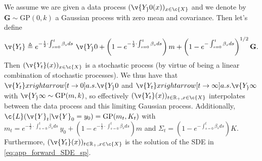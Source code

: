 \begin{proposition}{\parencite{phillips2022spectral}}{} \label{prop:mOU} We assume we are given a data process $(\v{Y_}0(x))_{x \in \c{X}}$ and we denote by $\mathbf{G} \sim \mathrm{GP}(0, k)$ a Gaussian process with zero mean and covariance.
	Then let's define $$\v{Y_t} \triangleq e^{-\frac{1}{2}\cdot \int_{s=0}^t \beta_s ds} ~\v{Y_}0 + \left(1 - e^{-\frac{1}{2}\cdot \int_{s=0}^t \beta_s ds} \right) m + \left(1 - e^{-\int_{s=0}^t \beta_s ds} \right)^{1/2} \mathbf{G}.
	$$
	Then $(\v{Y_t}(x))_{x \in \c{X}}$ is a stochastic process (by virtue of being a linear combination of stochastic processes).
	We thus have that $\v{Y_t} xrightarrow[t \rightarrow 0]{a.s.
			} \v{Y_}0$ and $\v{Y_t} xrightarrow[t \rightarrow \infty]{a.s.} \v{Y_}\infty$ with $\v{Y_}\infty \sim \mathrm{GP}(m, k)$, so effectively $(\v{Y_t}(x))_{t \in \R_+, x \in \c{X}}$ interpolates between the data process and this limiting Gaussian process.
	Additionally, $\c{L}({\v{Y}}_t|{\v{Y}}_0=y_0) = \mathrm{GP}(m_t, K_t)$ with $m_t = e^{-\frac{1}{2}\cdot \int_{s=0}^t \beta_s ds} ~y_0 + \left(1 - e^{-\frac{1}{2}\cdot \int_{s=0}^t \beta_s ds} \right) m $ and $\Sigma_t = \left(1 - e^{-\int_{s=0}^t \beta_s ds} \right) {K}$.
	Furthermore, $(\v{Y_t}(x))_{t \in \R_+, x \in \c{X}}$ is the solution of the SDE in \eqref{eq:app_forward_SDE_sp}.
\end{proposition}

